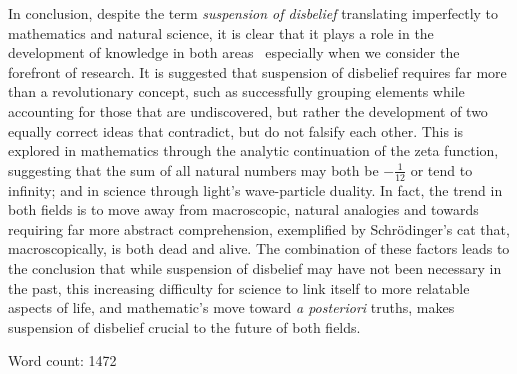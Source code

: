 In conclusion, despite the term \textit{suspension of disbelief} translating imperfectly to mathematics and natural science, it is clear that it plays a role in the development of knowledge in both areas \textendash\ especially when we consider the forefront of research. It is suggested that suspension of disbelief requires far more than a revolutionary concept, such as successfully grouping elements while accounting for those that are undiscovered, but rather the development of two equally correct ideas that contradict, but do not falsify each other. This is explored in mathematics through the analytic continuation of the zeta function, suggesting that the sum of all natural numbers may both be $-\frac{1}{12}$ or tend to infinity; and in science through light's wave-particle duality. In fact, the trend in both fields is to move away from macroscopic, natural analogies and towards requiring far more abstract comprehension, exemplified by Schr{\"o}dinger's cat that, macroscopically, is both dead and alive. The combination of these factors leads to the conclusion that while suspension of disbelief may have not been necessary in the past, this increasing difficulty for science to link itself to more relatable aspects of life, and mathematic's move toward \emph{a posteriori} truths, makes suspension of disbelief crucial to the future of both fields.

Word count: 1472




